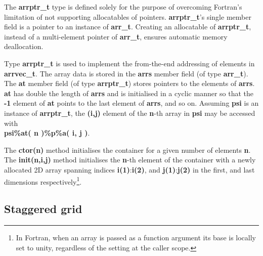 \documentclass[twocolumn]{article}
\newcommand{\prog}[1]{{\rm\bf#1}}
\begin{document}
  The \prog{arrptr\_t} type is defined solely for the purpose of overcoming Fortran's limitation
    of not supporting allocatables of pointers.
  \prog{arrptr\_t}'s single member field is a pointer to an instance of \prog{arr\_t}.
  Creating an allocatable of \prog{arrptr\_t}, instead of 
    a multi-element pointer of \prog{arr\_t}, ensures automatic memory deallocation.

  Type \prog{arrptr\_t} is used to implement the from-the-end addressing of elements in \prog{arrvec\_t}.
  The array data is stored in the \prog{arrs} member field (of type \prog{arr\_t}).
  The \prog{at} member field (of type \prog{arrptr\_t}) stores pointers to the elements of \prog{arrs}. 
  \prog{at} has double the length of \prog{arrs} and is initialised in a cyclic manner so that
    the \prog{-1} element of \prog{at} points to the last element of \prog{arrs}, and so on.
  Assuming \prog{psi} is an instance of \prog{arrptr\_t}, the \prog{(i,j)} element of the \prog{n}-th array in \prog{psi}
    may be accessed with\\ \prog{psi\%at( n )\%p\%a( i, j )}.

  The \prog{ctor(n)} method initialises the container for a given number of elements \prog{n}.
  The \prog{init(n,i,j)} method initialises the \prog{n}-th element of the container with 
    a newly allocated 2D array spanning indices \prog{i(1)}:\prog{i(2)}, 
    and \prog{j(1)}:\prog{j(2)} in the first, and last dimensions respectively\footnote{In Fortran, when an array
    is passed as a function argument its base is locally set to unity, regardless of the setting
    at the caller scope.}.

  \subsection{Staggered grid}\label{sec:grid}
\end{document}
